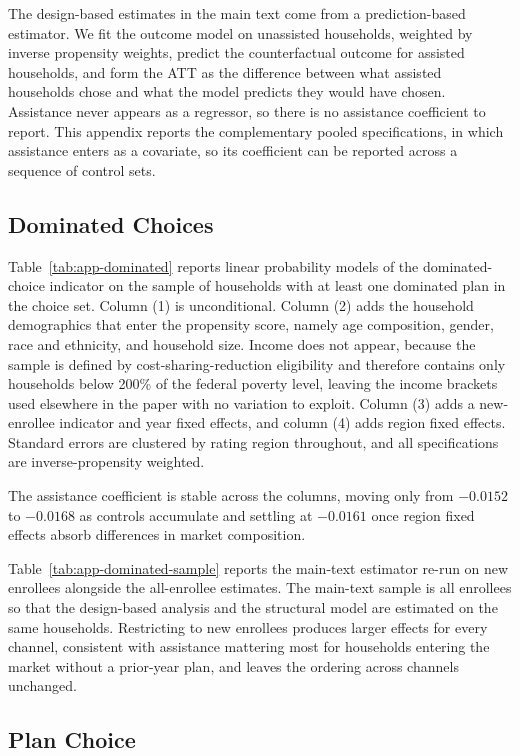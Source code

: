 \documentclass[12pt]{article}
\begin{document}
The design-based estimates in the main text come from a prediction-based estimator. We fit the outcome model on unassisted households, weighted by inverse propensity weights, predict the counterfactual outcome for assisted households, and form the ATT as the difference between what assisted households chose and what the model predicts they would have chosen. Assistance never appears as a regressor, so there is no assistance coefficient to report. This appendix reports the complementary pooled specifications, in which assistance enters as a covariate, so its coefficient can be reported across a sequence of control sets.

\subsection{Dominated Choices}

Table~\ref{tab:app-dominated} reports linear probability models of the dominated-choice indicator on the sample of households with at least one dominated plan in the choice set. Column (1) is unconditional. Column (2) adds the household demographics that enter the propensity score, namely age composition, gender, race and ethnicity, and household size. Income does not appear, because the sample is defined by cost-sharing-reduction eligibility and therefore contains only households below 200\% of the federal poverty level, leaving the income brackets used elsewhere in the paper with no variation to exploit. Column (3) adds a new-enrollee indicator and year fixed effects, and column (4) adds region fixed effects. Standard errors are clustered by rating region throughout, and all specifications are inverse-propensity weighted.

The assistance coefficient is stable across the columns, moving only from $-0.0152$ to $-0.0168$ as controls accumulate and settling at $-0.0161$ once region fixed effects absorb differences in market composition.

Table~\ref{tab:app-dominated-sample} reports the main-text estimator re-run on new enrollees alongside the all-enrollee estimates. The main-text sample is all enrollees so that the design-based analysis and the structural model are estimated on the same households. Restricting to new enrollees produces larger effects for every channel, consistent with assistance mattering most for households entering the market without a prior-year plan, and leaves the ordering across channels unchanged.

\subsection{Plan Choice}
\end{document}

